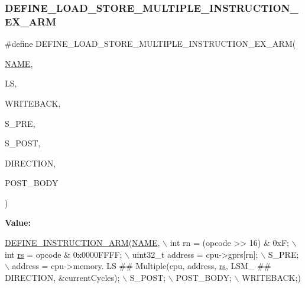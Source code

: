 \subsubsection{\texorpdfstring{D\+E\+F\+I\+N\+E\+\_\+\+L\+O\+A\+D\+\_\+\+S\+T\+O\+R\+E\+\_\+\+M\+U\+L\+T\+I\+P\+L\+E\+\_\+\+I\+N\+S\+T\+R\+U\+C\+T\+I\+O\+N\+\_\+\+E\+X\+\_\+\+A\+RM}{DEFINE\_LOAD\_STORE\_MULTIPLE\_INSTRUCTION\_EX\_ARM}}
{\footnotesize\ttfamily \#define D\+E\+F\+I\+N\+E\+\_\+\+L\+O\+A\+D\+\_\+\+S\+T\+O\+R\+E\+\_\+\+M\+U\+L\+T\+I\+P\+L\+E\+\_\+\+I\+N\+S\+T\+R\+U\+C\+T\+I\+O\+N\+\_\+\+E\+X\+\_\+\+A\+RM(\begin{DoxyParamCaption}\item[{}]{\mbox{\hyperlink{inflate_8h_a164ea0159d5f0b5f12a646f25f99eceaa67bc2ced260a8e43805d2480a785d312}{N\+A\+ME}},  }\item[{}]{LS,  }\item[{}]{W\+R\+I\+T\+E\+B\+A\+CK,  }\item[{}]{S\+\_\+\+P\+RE,  }\item[{}]{S\+\_\+\+P\+O\+ST,  }\item[{}]{D\+I\+R\+E\+C\+T\+I\+ON,  }\item[{}]{P\+O\+S\+T\+\_\+\+B\+O\+DY }\end{DoxyParamCaption})}

{\bfseries Value\+:}
\begin{DoxyCode}
\mbox{\hyperlink{isa-arm_8c_a56ae89d1d9edfe3d78f30c0a60273883}{DEFINE\_INSTRUCTION\_ARM}}(\mbox{\hyperlink{inflate_8h_a164ea0159d5f0b5f12a646f25f99eceaa67bc2ced260a8e43805d2480a785d312}{NAME}}, \(\backslash\)
        \textcolor{keywordtype}{int} rn = (opcode >> 16) & 0xF; \(\backslash\)
        int \mbox{\hyperlink{isa-thumb_8c_a03b78d51ad860bbea2f9c98276d0b70b}{rs}} = opcode & 0x0000FFFF; \(\backslash\)
        uint32\_t address = cpu->gprs[rn]; \(\backslash\)
        S\_PRE; \(\backslash\)
        address = cpu->memory. LS ## Multiple(cpu, address, \mbox{\hyperlink{isa-thumb_8c_a03b78d51ad860bbea2f9c98276d0b70b}{rs}}, LSM\_ ## DIRECTION, &currentCycles); \(\backslash\)
        S\_POST; \(\backslash\)
        POST\_BODY; \(\backslash\)
        WRITEBACK;)
\end{DoxyCode}
\mbox{\label{isa-arm_8c_ada2566a0e14f1bde045017588e6fe1e7}} 
